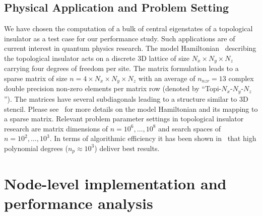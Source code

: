 \documentclass[letterpaper]{llncs}
\begin{document}
\subsection{Physical Application and Problem Setting} \label{sect:setting}
We have chosen the computation of a bulk of central eigenstates of a
topological insulator as a test case for our performance study. Such 
applications are of current interest in quantum physics research. The
model Hamiltonian~\cite{SRAF12} describing the topological insulator acts on a
discrete 3D lattice of size $N_x \times N_y \times N_z$ carrying four
degrees of freedom per site. The matrix formulation leads to a sparse
matrix of size $n=4 \times N_x \times N_y \times N_z$ with an average
of $n_{nzr}=13$ complex double precision non-zero elements per matrix
row (denoted by ``Topi-$N_x$-$N_y$-$N_z$''). The matrices have several
subdiagonals leading to a structure similar to 3D stencil. Please
see~\cite{Kreutzer15KPM,Pieper15ChebFD} for more details on the model
Hamiltonian and its mapping to a sparse matrix. Relevant problem
parameter settings in topological insulator research are matrix
dimensions of $n=10^6,\ldots,10^8$ and search spaces of
$n=10^2,\ldots,10^3$. In terms of algorithmic efficiency it has been
shown in~\cite{Pieper15ChebFD} that high polynomial degrees ($n_p
\approx 10^3$) deliver best results.


\section{Node-level implementation and performance analysis}
\end{document}

